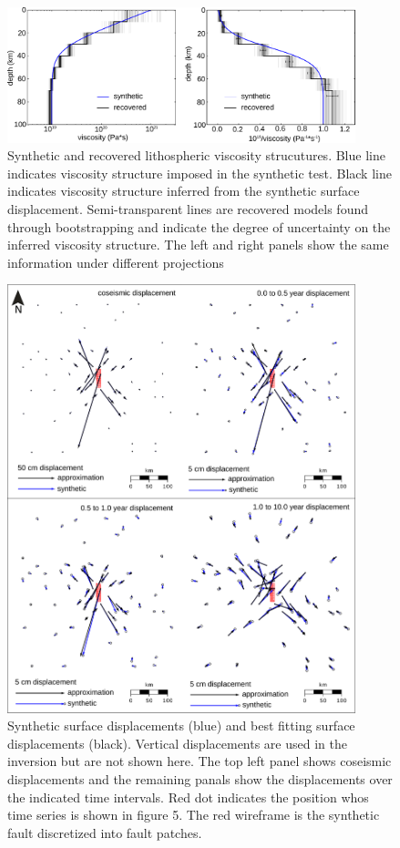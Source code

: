 \documentclass[12pt]{article}
\begin{document}
\begin{figure}[h!]\label{figure3}
  \centering
  \includegraphics[width=0.9\textwidth]{FinalFigures/Figure3.pdf}
  \caption{Synthetic and recovered lithospheric viscosity strucutures.
    Blue line indicates viscosity structure imposed in the synthetic
    test. Black line indicates viscosity structure inferred from the
    synthetic surface displacement.  Semi-transparent lines are
    recovered models found through bootstrapping and indicate the
    degree of uncertainty on the inferred viscosity structure.  The
    left and right panels show the same information under
    different projections}
  \label{figure 3}
\end{figure}

\begin{figure}[h!]\label{figure4}
  \centering
  \includegraphics[width=0.9\textwidth]{FinalFigures/Figure4.pdf}
  \caption{Synthetic surface displacements (blue) and best fitting
    surface displacements (black).  Vertical displacements are used in
    the inversion but are not shown here.  The top left panel shows
    coseismic displacements and the remaining panals show the
    displacements over the indicated time intervals. Red dot indicates
    the position whos time series is shown in figure 5. The red wireframe
    is the synthetic fault discretized into fault patches.}
  \label{figure 4}
\end{figure}
\end{document}
